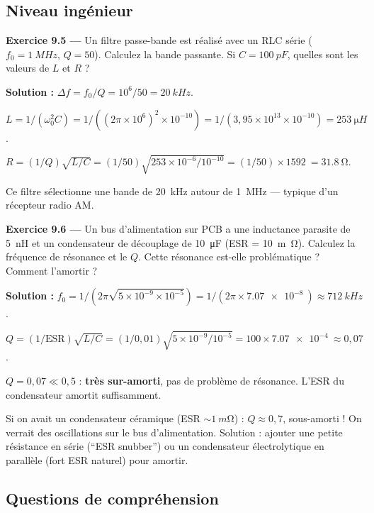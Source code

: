 \documentclass[12pt,a4paper,twoside]{book}
\begin{document}
\subsection*{Niveau ingénieur}

\textbf{Exercice 9.5 ---} Un filtre passe-bande est réalisé avec un RLC série ($f_0 = \SI{1}{MHz}$, $Q = 50$). Calculez la bande passante. Si $C = \SI{100}{pF}$, quelles sont les valeurs de $L$ et $R$ ?

\begin{pratique}
\textbf{Solution :} $\Delta f = f_0/Q = 10^6/50 = \SI{20}{kHz}$.

$L = 1/(\omega_0^2 C) = 1/((2\pi\times10^6)^2 \times 10^{-10}) = 1/(3{,}95\times10^{13}\times10^{-10}) = \SI{253}{\micro H}$.

$R = (1/Q)\sqrt{L/C} = (1/50)\sqrt{253\times10^{-6}/10^{-10}} = (1/50)\times\SI{1592}{} = \SI{31.8}{\ohm}$.

Ce filtre sélectionne une bande de \SI{20}{kHz} autour de \SI{1}{MHz} --- typique d'un récepteur radio AM.
\end{pratique}

\textbf{Exercice 9.6 ---} Un bus d'alimentation sur PCB a une inductance parasite de \SI{5}{nH} et un condensateur de découplage de \SI{10}{\micro F} (ESR = \SI{10}{m\ohm}). Calculez la fréquence de résonance et le $Q$. Cette résonance est-elle problématique ? Comment l'amortir ?

\begin{pratique}
\textbf{Solution :} $f_0 = 1/(2\pi\sqrt{5\times10^{-9}\times10^{-5}}) = 1/(2\pi\times\SI{7.07e-8}{}) \approx \SI{712}{kHz}$.

$Q = (1/\text{ESR})\sqrt{L/C} = (1/0{,}01)\sqrt{5\times10^{-9}/10^{-5}} = 100\times\SI{7.07e-4}{} \approx 0{,}07$.

$Q = 0{,}07 \ll 0{,}5$ : \textbf{très sur-amorti}, pas de problème de résonance. L'ESR du condensateur amortit suffisamment.

Si on avait un condensateur céramique (ESR $\sim\SI{1}{m\ohm}$) : $Q \approx 0{,}7$, sous-amorti ! On verrait des oscillations sur le bus d'alimentation. Solution : ajouter une petite résistance en série (``ESR snubber'') ou un condensateur électrolytique en parallèle (fort ESR naturel) pour amortir.
\end{pratique}

\subsection*{Questions de compréhension}
\end{document}
